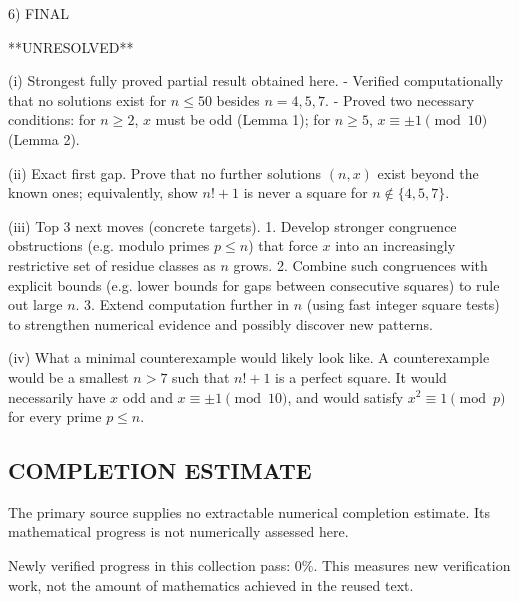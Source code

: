 6) FINAL

**UNRESOLVED**

(i) Strongest fully proved partial result obtained here.
- Verified computationally that no solutions exist for $n\le 50$ besides $n=4,5,7$.
- Proved two necessary conditions: for $n\ge 2$, $x$ must be odd (Lemma 1); for $n\ge 5$, $x\equiv \pm 1\pmod{10}$ (Lemma 2).

(ii) Exact first gap.
Prove that no further solutions $(n,x)$ exist beyond the known ones; equivalently, show $n!+1$ is never a square for $n\notin\{4,5,7\}$.

(iii) Top 3 next moves (concrete targets).
1. Develop stronger congruence obstructions (e.g. modulo primes $p\le n$) that force $x$ into an increasingly restrictive set of residue classes as $n$ grows.
2. Combine such congruences with explicit bounds (e.g. lower bounds for gaps between consecutive squares) to rule out large $n$.
3. Extend computation further in $n$ (using fast integer square tests) to strengthen numerical evidence and possibly discover new patterns.

(iv) What a minimal counterexample would likely look like.
A counterexample would be a smallest $n>7$ such that $n!+1$ is a perfect square. It would necessarily have $x$ odd and $x\equiv \pm 1\pmod{10}$, and would satisfy $x^2\equiv 1\pmod p$ for every prime $p\le n$.




\subsection*{COMPLETION ESTIMATE}
The primary source supplies no extractable numerical completion estimate. Its mathematical progress is not numerically assessed here.

Newly verified progress in this collection pass: $0\%$. This measures new verification work, not the amount of mathematics achieved in the reused text.
